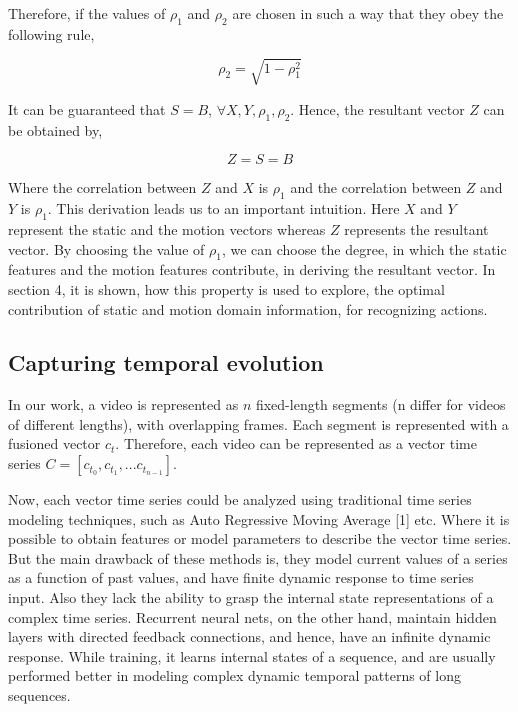 Therefore, if the values of $\rho_{1}$ and $\rho_{2}$ are chosen in such a way that they obey the following
rule,

\begin{equation}
\rho_{2} = \sqrt{1-\rho_{1}^2}
\end{equation}

It can be guaranteed that $S = B$, $\forall X,Y,\rho_{1},\rho_{2}$. Hence, the resultant vector $Z$ can be obtained
by,

\begin{equation}
Z=S=B
\end{equation}

Where the correlation between $Z$ and $X$ is $\rho_{1}$ and the correlation between $Z$ and $Y$ is $\rho_{1}$. This derivation 
leads us to an important intuition. Here $X$ and $Y$ represent the static and the
motion vectors whereas $Z$ represents the resultant vector. By choosing the value of $\rho_{1}$, we can
choose the degree, in which the static features and the motion features contribute,
in deriving the resultant vector. In section 4, it is shown, how this property is used to explore, the optimal contribution of 
static and motion domain information, for recognizing actions. 

\subsection{Capturing temporal evolution}
In our work, a video is represented as $n$
fixed-length segments (n differ for videos of different lengths),  with overlapping frames.  Each segment
is represented with a fusioned vector $c_{t}$. Therefore, each video can be represented as a vector time series 
$C = [c_{t_0},c_{t_1},...c_{t_{n-1}}]$. 

Now, each vector time series could be  analyzed using traditional time series modeling techniques,
such as Auto Regressive Moving Average [1] etc. Where it is possible to obtain features or model parameters to describe the
vector time series. 
But the main drawback of these methods is, they model current values of a series as a function of past values,
and have finite dynamic response to time series input. Also they lack the ability to grasp the internal state 
representations of a complex time series. Recurrent neural nets, on the other hand, maintain hidden layers with directed feedback connections, and hence,
have an infinite dynamic response. While training, it learns internal states of a sequence,
and are usually performed better in modeling complex dynamic temporal patterns of long sequences.


